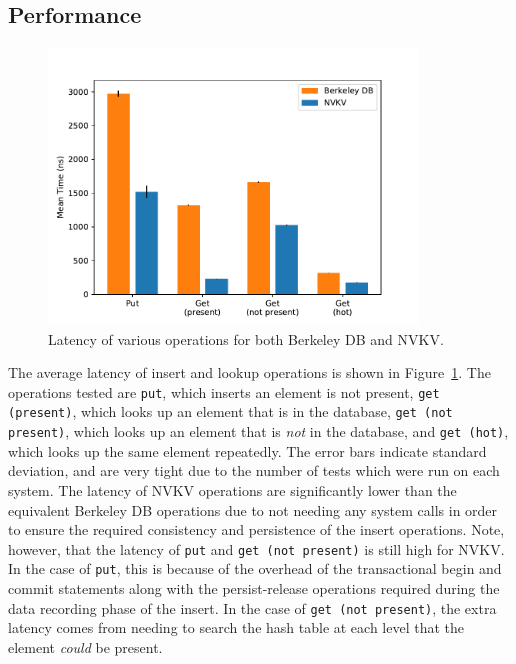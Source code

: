 \subsection{Performance}

\begin{figure}
\centering
\hspace*{-0.5in}
\includegraphics[width=98mm]{fig/perf}
\caption{Latency of various operations for both Berkeley DB and NVKV.}
\label{fig:perf}
\end{figure}

The average latency of insert and lookup operations is shown in
Figure~\ref{fig:perf}. The operations tested are \texttt{put}, which inserts an
element is not present, \texttt{get (present)}, which
looks up an element that is in the database, \texttt{get (not present)}, which
looks up an element that is \textit{not} in the database, and \texttt{get
(hot)}, which looks up the same element repeatedly. The error bars indicate
standard deviation, and are very tight due to the number of tests which were run
on each system. The latency of NVKV operations are significantly lower than the
equivalent Berkeley DB operations due to not needing any system calls in order
to ensure the required consistency and persistence of the insert operations.
Note, however, that the latency of \texttt{put} and \texttt{get (not present)}
is still high for NVKV. In the case of \texttt{put}, this is because of the
overhead of the transactional begin and commit statements along with the
persist-release operations required during the data recording phase of the
insert. In the case of \texttt{get (not present)}, the extra latency comes from
needing to search the hash table at each level that the element \textit{could}
be present.







